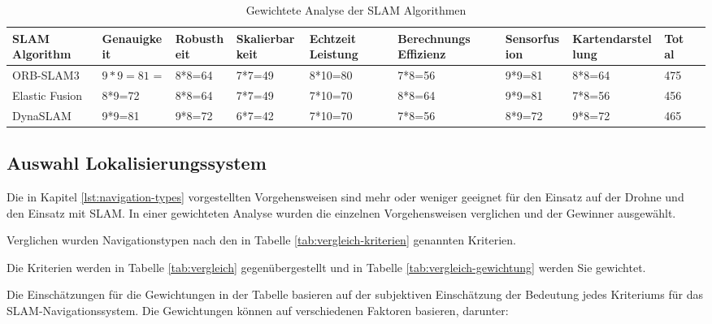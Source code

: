\begin{table}[H]
    \begin{center}
        \begin{adjustbox}{max width=\textwidth}
        \begin{tabular}{|l|p{2cm}|p{2cm}|p{2cm}|p{2cm}|p{2cm}|p{2cm}|p{2cm}|p{2cm}|p{2cm}|}
            \hline
            SLAM \-Algorithm & Genauig\-keit & Robust\-heit & Skalierbar\-keit & Echtzeit Leistung & Berech\-nungs Effizienz & Sensor\-fusion & Karten\-darstellung & Total\\
            \hline
            \rowcolor{green}
            ORB-SLAM3 & $9*9=81$ = & 8*8=64 & 7*7=49 & 8*10=80 & 7*8=56 & 9*9=81 & 8*8=64 &  475\\
            \hline
            Elastic Fusion & 8*9=72 & 8*8=64 & 7*7=49 & 7*10=70 & 8*8=64 & 9*9=81 & 7*8=56 &  456\\
            \hline
            DynaSLAM & 9*9=81 & 9*8=72 & 6*7=42 & 7*10=70 & 7*8=56 & 8*9=72 & 9*8=72 & 465\\
            \hline
            \end{tabular}
        \end{adjustbox}
    \caption{Gewichtete Analyse der \ac{SLAM} Algorithmen}\label{tab:vergleich-slam-analyse}
\end{center}
\end{table}

\subsection{Auswahl Lokalisierungssystem}

Die in Kapitel \ref{lst:navigation-types} vorgestellten Vorgehensweisen sind mehr oder weniger geeignet für den Einsatz auf der Drohne und den Einsatz mit \ac{SLAM}.
In einer gewichteten Analyse wurden die einzelnen Vorgehensweisen verglichen und der Gewinner ausgewählt.

Verglichen wurden Navigationstypen nach den in Tabelle \ref{tab:vergleich-kriterien} genannten Kriterien.

Die Kriterien werden in Tabelle \ref{tab:vergleich} gegenübergestellt und in Tabelle \ref{tab:vergleich-gewichtung} werden Sie gewichtet.

Die Einschätzungen für die Gewichtungen in der Tabelle basieren auf der subjektiven Einschätzung der Bedeutung jedes Kriteriums für das \ac{SLAM}-Navigationssystem. Die Gewichtungen können auf verschiedenen Faktoren basieren, darunter:

